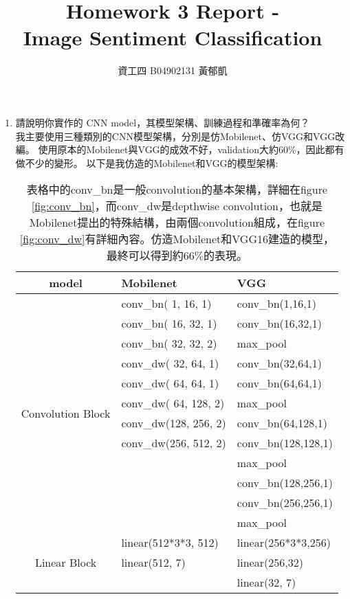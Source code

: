 \documentclass[12pt, a4paper]{article}
\author{資工四 B04902131 黃郁凱}
\title{\vspace{-2cm} Homework 3 Report - \\Image Sentiment Classification}
\begin{document}
\maketitle

\begin{enumerate}
\item 請說明你實作的 CNN model，其模型架構、訓練過程和準確率為何？\\
我主要使用三種類別的CNN模型架構，分別是仿Mobilenet、仿VGG和VGG改編。
使用原本的Mobilenet與VGG的成效不好，validation大約$60\%$，因此都有做不少的變形。
以下是我仿造的Mobilenet和VGG的模型架構:\\
\begin{table}[h]
\centering
\begin{tabular}{|c|l|l|}\hline
    model&Mobilenet & VGG\\ \hline
    \multirow{12}{*}{Convolution Block}&conv\_bn(  1,  16, 1)&conv\_bn(1,16,1)\\
    &conv\_bn( 16,  32, 1)&conv\_bn(16,32,1)\\
    &conv\_bn( 32,  32, 2)&max\_pool\\
    &conv\_dw( 32,  64, 1)&conv\_bn(32,64,1)\\
    &conv\_dw( 64,  64, 1)&conv\_bn(64,64,1)\\
    &conv\_dw( 64, 128, 2)&max\_pool\\
    &conv\_dw(128, 256, 2)&conv\_bn(64,128,1)\\
    &conv\_dw(256, 512, 2)&conv\_bn(128,128,1)\\ 
    &                     &max\_pool\\
    &                     &conv\_bn(128,256,1)\\
    &                     &conv\_bn(256,256,1)\\
    &                     &max\_pool\\ \hline
    \multirow{3}{*}{Linear Block}&linear(512*3*3, 512)&linear(256*3*3,256)\\
    &linear(512, 7)&linear(256,32)\\
    &&linear(32, 7)\\ \hline
\end{tabular}
\caption{表格中的conv\_bn是一般convolution的基本架構，詳細在figure \ref{fig:conv_bn}，而conv\_dw是depthwise convolution，也就是Mobilenet提出的特殊結構，由兩個convolution組成，在figure \ref{fig:conv_dw}有詳細內容。仿造Mobilenet和VGG16建造的模型，最終可以得到約$66\%$的表現。}
\end{table}


\end{enumerate}
\end{document}
